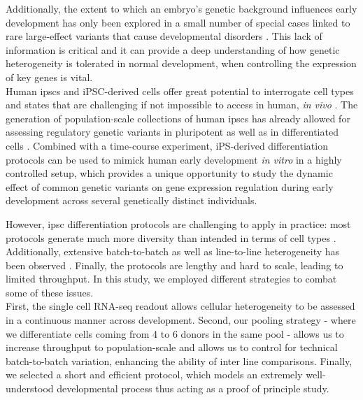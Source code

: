Additionally, the extent to which an embryo’s genetic background influences early development has only been explored in a small number of special cases linked to rare large-effect variants that cause developmental disorders \cite{}.
This lack of information is critical and it can provide a deep understanding of how genetic heterogeneity is tolerated in normal development, when controlling the expression of key genes is vital.\\

Human \gls{ipsc}s and iPSC-derived cells offer great potential to interrogate cell types and states that are challenging if not impossible to access in human, \textit{in vivo} \cite{kilpinen2017common}.
The generation of population-scale collections of human \gls{ipsc}s \cite{kilpinen2017common, carcamo2017analysis} has already allowed for assessing regulatory genetic variants in pluripotent \cite{kilpinen2017common, carcamo2017analysis} as well as in differentiated cells \cite{schwartzentruber2018molecular, alasoo2018shared, pashos2017large}.
Combined with a time-course experiment, iPS-derived differentiation protocols can be used to mimick human early development \textit{in vitro} in a highly controlled setup, which provides a unique opportunity to study the dynamic effect of common genetic variants on gene expression regulation during early development across several genetically distinct individuals.

However, \gls{ipsc} differentiation protocols are challenging to apply in practice: most protocols generate much more diversity than intended in terms of cell types 
\cite{bock2011reference}.
Additionally, extensive batch-to-batch as well as line-to-line heterogeneity has been observed \cite{schwartzentruber2018molecular, carcamo2017analysis}. 
Finally, the protocols are lengthy and hard to scale, leading to limited throughput.
In this study, we employed different strategies to combat some of these issues.\\ 

First, the single cell RNA-seq readout allows cellular heterogeneity to be assessed in a continuous manner across development.
Second, our pooling strategy - where we differentiate cells coming from 4 to 6 donors in the same pool - allows us to increase throughput to population-scale and allows us to control for technical batch-to-batch variation, enhancing the ability of inter line comparisons.
Finally, we selected a short and efficient protocol, which models an extremely well-understood developmental process thus acting as a proof of principle study.\\

